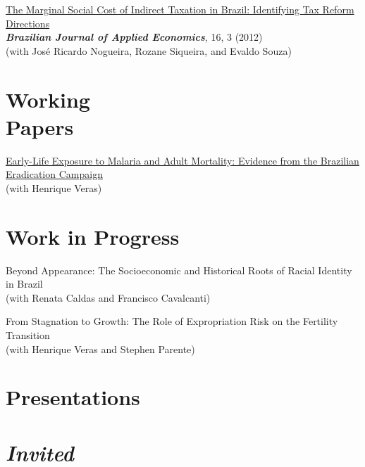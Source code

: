 \documentclass[mm, 10pt]{simple_style}
\begin{document}
\begin{resume}
\href{https://www.scielo.br/scielo.php?pid=S1413-80502012000300001&script=sci_arttext}{The Marginal Social Cost of Indirect Taxation in Brazil: Identifying Tax Reform Directions} \\
\textbf{\textit{Brazilian Journal of Applied Economics}}, 16, 3 (2012) \\
(with Jos\'e Ricardo Nogueira, Rozane Siqueira, and Evaldo Souza)



\section{Working \\ Papers}

\href{https://drive.google.com/file/d/1dIZK5thBKYu-IsduU5E65SdG_z4sQW8h/view}{Early-Life Exposure to Malaria and Adult Mortality: Evidence from the Brazilian Eradication Campaign}\\
(with Henrique Veras)

\section{Work in Progress}

Beyond Appearance: The Socioeconomic and Historical Roots of Racial Identity in Brazil \\
(with Renata Caldas and Francisco Cavalcanti) 

From Stagnation to Growth: The Role of Expropriation Risk on the Fertility Transition\\
(with Henrique Veras and Stephen Parente)



\section{Presentations \\ {\protect\footnotesize {} \\ \emph{Invited}}}


\end{resume}
\end{document}
